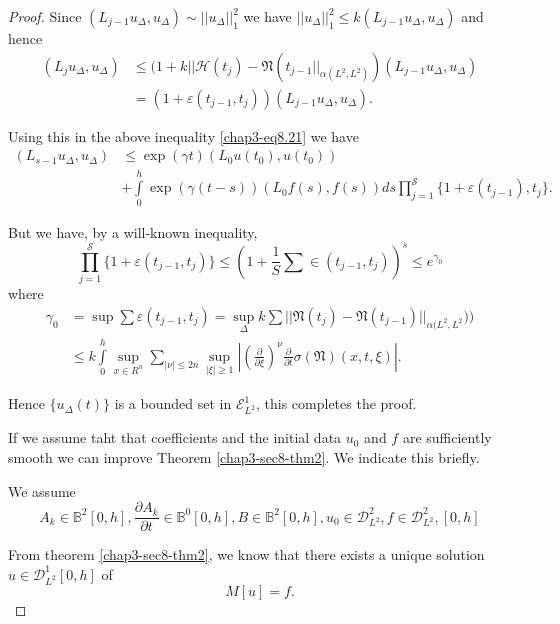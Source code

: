 \begin{proof}
Since $(L_{j -1} u_{\Delta}, u_{\Delta}) \sim || u_{\Delta} ||^2_1$
we have $|| u_{\Delta}||^2_1 \leq k (L_{j-1} u_{\Delta},
u_{\Delta})$ and hence  
\begin{align*}
(L_j u_{\Delta}, u_{\Delta}) & \leq (1 + k|| \mathscr{H}(t_j) -
  \mathfrak{N}(t_{j-1}||_{\alpha (L^2, L^2)}) (L_{j-1}u_{\Delta},
  u_{\Delta})\\ 
&= (1 + \varepsilon (t_{j-1}, t_j)) (L_{j-1} u_{\Delta}, u_{\Delta}).  
\end{align*}\pageoriginale

Using this in the above inequality \eqref{chap3-eq8.21} we have  
\begin{align*}
(L_{s-1} u_{\Delta}, u_{\Delta}) & \leq \exp (\gamma t) (L_0 u (t_0),
u(t_0)) \\
& + \int\limits^h_0 \exp (\gamma(t-s)) (L_0 f(s), f(s)) ds
\prod\limits^{\mathscr{S}}_{j=1} \{1+ \varepsilon (t_{j-1}), t_j \}. 
\end{align*}

But we have, by a will-known inequality,
$$
\prod^{\mathscr{S}}_{j=1} \{1 + \varepsilon (t_{j-1}, t_j) \}
\leq \left(1 + \frac{1}{S} \sum \in (t_{j-1}, t_j)\right)^s \leq e^{\gamma_0} 
$$
where
\begin{align*}
\gamma_0 & = \sup \sum \varepsilon (t_{j-1}, t_j) = \sup
\limits_{\Delta} k  \sum || \mathfrak{N} (t_j) -
\mathfrak{N}(t_{j-1})||_{\alpha (L^2, L^2}))\\
& \leq k \int\limits^h_0 \sup\limits_{x \in R^n} \sum\limits_{| \nu | \leq
  2n} \sup\limits_{| \xi | \geq 1} \left| \left(\frac{\partial}{\partial
  \xi}\right)^{\nu} \frac{\partial}{\partial t} \sigma (\mathfrak{N}) (x, t,
\xi) \right|. 
\end{align*}

Hence $\{u_{\Delta} (t) \}$ is a bounded set in $\mathscr{E}^1_{L^2}$, 
this completes the proof. 

If we assume taht that coefficients and the initial data $u_0$ and $f$
are sufficiently smooth we can improve Theorem
\ref{chap3-sec8-thm2}. We indicate this briefly. 

We assume 
$$
A_k \in \mathbb{B}^2 [0, h], \frac{\partial A_k}{\partial t}
\in \mathbb{B}^0 [0, h], B \in \mathbb{B}^2 [0, h], u_0
\in \mathscr{D}^2_{L^2}, f \in \mathscr{D}^2_{L^2}, [0,
  h] 
$$

From theorem \ref{chap3-sec8-thm2}, we know that there exists a unique
solution $u \in\mathscr{D}^1_{L^2} [0, h]$ of  
\begin{equation*}
M[ u ] = f. \tag{8.16}\label{chap3-eq8.16}
\end{equation*}


\end{proof}
